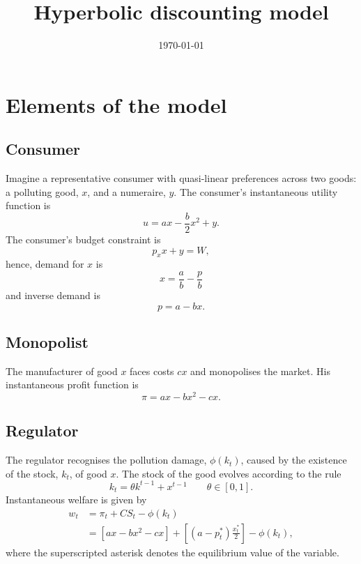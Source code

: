 \documentclass{amsart}
\title{Hyperbolic discounting model} \date{\today}
\begin{document}
\maketitle

\section{Elements of the model}
\label{sec:elements-model}

\subsection{Consumer}
\label{sec:consumer}

Imagine a representative consumer with quasi-linear preferences across
two goods: a polluting good, $x$, and a numeraire, $y$. The consumer's
instantaneous utility function is
\begin{equation}
  \label{eq:1} u = ax - \frac{b}{2}x^2 + y.
\end{equation} The consumer's budget constraint is
\begin{equation}
  \label{eq:2} p_x x + y = W,
\end{equation} hence, demand for $x$ is
\begin{equation}
  \label{eq:3} x = \frac{a}{b} - \frac{p}{b}
\end{equation} and inverse demand is
\begin{equation}
  \label{eq:4} p = a - bx.
\end{equation}

\subsection{Monopolist}
\label{sec:monopolist}

The manufacturer of good $x$ faces costs $cx$ and monopolises the
market. His instantaneous profit function is
\begin{equation}
  \label{eq:5} \pi = ax - bx^2 - cx.
\end{equation}

\subsection{Regulator}
\label{sec:regulator}

The regulator recognises the pollution damage, $\phi(k_t)$, caused by
the existence of the stock, $k_t$, of good $x$. The stock of the good
evolves according to the rule
\begin{equation}
  \label{eq:7} k_t = \theta k^{t-1} + x^{t-1} \qquad \theta \in [0,1].
\end{equation} Instantaneous welfare is given by
\begin{align}
  \label{eq:6} w_t &= \pi_t + CS_t - \phi(k_t) \\ &= \left[ ax - bx^2
- cx \right] + \left[ \left( a-p_t^* \right) \frac{x_t^*}{2} \right] -
\phi(k_t),
\end{align} where the superscripted asterisk denotes the equilibrium
value of the variable.
\end{document}
